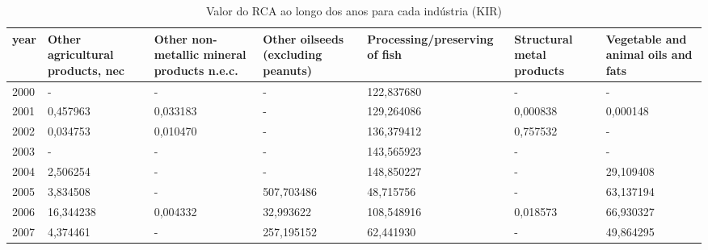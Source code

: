 \begin{table}
\centering
\caption{Valor do RCA ao longo dos anos para cada indústria (KIR)}
\begin{tabular}{p{1cm}p{2cm}p{2cm}p{2cm}p{2cm}p{2cm}p{2cm}}
\toprule
 year &  Other agricultural products, nec &  Other non-metallic mineral products n.e.c. &  Other oilseeds (excluding peanuts) &  Processing/preserving of fish &  Structural metal products &  Vegetable and animal oils and fats \\
\midrule
 2000 &                                 - &                                           - &                                   - &                     122,837680 &                          - &                                   - \\
 2001 &                          0,457963 &                                    0,033183 &                                   - &                     129,264086 &                   0,000838 &                            0,000148 \\
 2002 &                          0,034753 &                                    0,010470 &                                   - &                     136,379412 &                   0,757532 &                                   - \\
 2003 &                                 - &                                           - &                                   - &                     143,565923 &                          - &                                   - \\
 2004 &                          2,506254 &                                           - &                                   - &                     148,850227 &                          - &                           29,109408 \\
 2005 &                          3,834508 &                                           - &                          507,703486 &                      48,715756 &                          - &                           63,137194 \\
 2006 &                         16,344238 &                                    0,004332 &                           32,993622 &                     108,548916 &                   0,018573 &                           66,930327 \\
 2007 &                          4,374461 &                                           - &                          257,195152 &                      62,441930 &                          - &                           49,864295 \\

\end{tabular}
\end{table}

